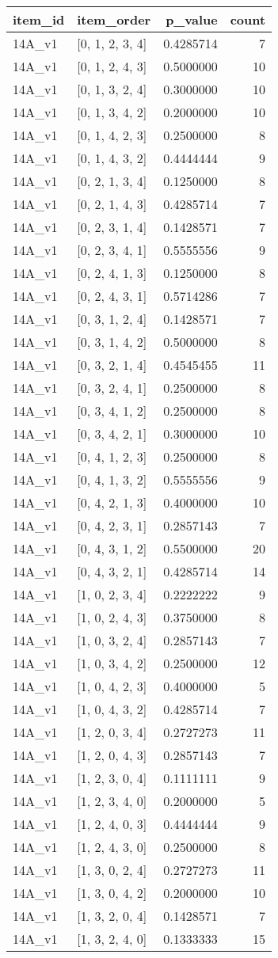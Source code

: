 \documentclass[]{book}
\theoremstyle{definition}
\theoremstyle{definition}
\theoremstyle{definition}
\theoremstyle{remark}
\begin{document}
\begin{longtable}[]{@{}llrr@{}}
\toprule
item\_id & item\_order & p\_value & count\tabularnewline
\midrule
\endhead
14A\_v1 & {[}0, 1, 2, 3, 4{]} & 0.4285714 & 7\tabularnewline
14A\_v1 & {[}0, 1, 2, 4, 3{]} & 0.5000000 & 10\tabularnewline
14A\_v1 & {[}0, 1, 3, 2, 4{]} & 0.3000000 & 10\tabularnewline
14A\_v1 & {[}0, 1, 3, 4, 2{]} & 0.2000000 & 10\tabularnewline
14A\_v1 & {[}0, 1, 4, 2, 3{]} & 0.2500000 & 8\tabularnewline
14A\_v1 & {[}0, 1, 4, 3, 2{]} & 0.4444444 & 9\tabularnewline
14A\_v1 & {[}0, 2, 1, 3, 4{]} & 0.1250000 & 8\tabularnewline
14A\_v1 & {[}0, 2, 1, 4, 3{]} & 0.4285714 & 7\tabularnewline
14A\_v1 & {[}0, 2, 3, 1, 4{]} & 0.1428571 & 7\tabularnewline
14A\_v1 & {[}0, 2, 3, 4, 1{]} & 0.5555556 & 9\tabularnewline
14A\_v1 & {[}0, 2, 4, 1, 3{]} & 0.1250000 & 8\tabularnewline
14A\_v1 & {[}0, 2, 4, 3, 1{]} & 0.5714286 & 7\tabularnewline
14A\_v1 & {[}0, 3, 1, 2, 4{]} & 0.1428571 & 7\tabularnewline
14A\_v1 & {[}0, 3, 1, 4, 2{]} & 0.5000000 & 8\tabularnewline
14A\_v1 & {[}0, 3, 2, 1, 4{]} & 0.4545455 & 11\tabularnewline
14A\_v1 & {[}0, 3, 2, 4, 1{]} & 0.2500000 & 8\tabularnewline
14A\_v1 & {[}0, 3, 4, 1, 2{]} & 0.2500000 & 8\tabularnewline
14A\_v1 & {[}0, 3, 4, 2, 1{]} & 0.3000000 & 10\tabularnewline
14A\_v1 & {[}0, 4, 1, 2, 3{]} & 0.2500000 & 8\tabularnewline
14A\_v1 & {[}0, 4, 1, 3, 2{]} & 0.5555556 & 9\tabularnewline
14A\_v1 & {[}0, 4, 2, 1, 3{]} & 0.4000000 & 10\tabularnewline
14A\_v1 & {[}0, 4, 2, 3, 1{]} & 0.2857143 & 7\tabularnewline
14A\_v1 & {[}0, 4, 3, 1, 2{]} & 0.5500000 & 20\tabularnewline
14A\_v1 & {[}0, 4, 3, 2, 1{]} & 0.4285714 & 14\tabularnewline
14A\_v1 & {[}1, 0, 2, 3, 4{]} & 0.2222222 & 9\tabularnewline
14A\_v1 & {[}1, 0, 2, 4, 3{]} & 0.3750000 & 8\tabularnewline
14A\_v1 & {[}1, 0, 3, 2, 4{]} & 0.2857143 & 7\tabularnewline
14A\_v1 & {[}1, 0, 3, 4, 2{]} & 0.2500000 & 12\tabularnewline
14A\_v1 & {[}1, 0, 4, 2, 3{]} & 0.4000000 & 5\tabularnewline
14A\_v1 & {[}1, 0, 4, 3, 2{]} & 0.4285714 & 7\tabularnewline
14A\_v1 & {[}1, 2, 0, 3, 4{]} & 0.2727273 & 11\tabularnewline
14A\_v1 & {[}1, 2, 0, 4, 3{]} & 0.2857143 & 7\tabularnewline
14A\_v1 & {[}1, 2, 3, 0, 4{]} & 0.1111111 & 9\tabularnewline
14A\_v1 & {[}1, 2, 3, 4, 0{]} & 0.2000000 & 5\tabularnewline
14A\_v1 & {[}1, 2, 4, 0, 3{]} & 0.4444444 & 9\tabularnewline
14A\_v1 & {[}1, 2, 4, 3, 0{]} & 0.2500000 & 8\tabularnewline
14A\_v1 & {[}1, 3, 0, 2, 4{]} & 0.2727273 & 11\tabularnewline
14A\_v1 & {[}1, 3, 0, 4, 2{]} & 0.2000000 & 10\tabularnewline
14A\_v1 & {[}1, 3, 2, 0, 4{]} & 0.1428571 & 7\tabularnewline
14A\_v1 & {[}1, 3, 2, 4, 0{]} & 0.1333333 & 15\tabularnewline

\end{longtable}
\end{document}
